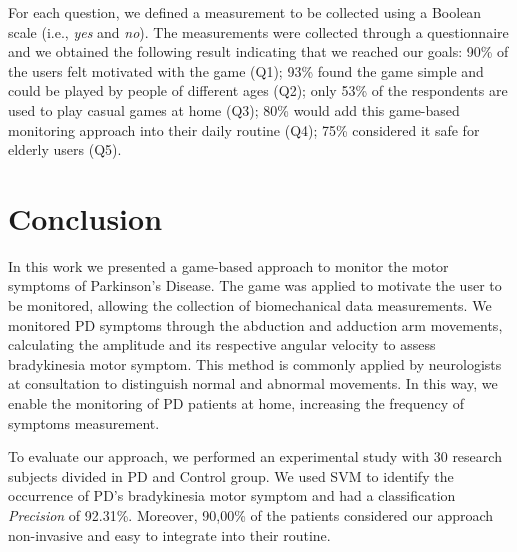 \documentclass[10pt, conference, compsocconf]{IEEEtran}
\begin{document}
For each question, we defined a measurement to be collected using a Boolean scale (i.e., \emph{yes} and \emph{no}). The measurements were collected through a questionnaire and we obtained the following result indicating that we reached our goals: 90\% of the users felt motivated with the game (Q1); 93\% found the game simple and could be played by people of different ages (Q2); only 53\% of the respondents are used to play casual games at home (Q3); 80\% would add this game-based monitoring approach into their daily routine (Q4); 75\% considered it safe for elderly users (Q5).

\section{Conclusion}
\label{conclusion}

In this work we presented a game-based approach to monitor the motor symptoms of Parkinson's Disease. The game was applied to motivate the user to be monitored, allowing the collection of biomechanical data measurements. We monitored PD symptoms through the abduction and adduction arm movements, calculating the amplitude and its respective angular velocity to assess bradykinesia motor symptom. This method is commonly applied by neurologists at consultation to distinguish normal and abnormal movements. In this way, we enable the monitoring of PD patients at home, increasing the frequency of symptoms measurement.

To evaluate our approach, we performed an experimental study with 30 research subjects divided in PD and Control group. We used SVM to identify the occurrence of PD's bradykinesia motor symptom and had a classification \textit{Precision} of 92.31\%. Moreover, 90,00\% of the patients considered our approach non-invasive and easy to integrate into their routine. 






\end{document}
